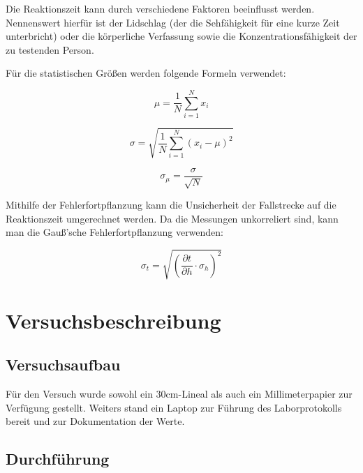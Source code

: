\documentclass[a4paper,12pt]{article}
\begin{document}
Die Reaktionszeit kann durch verschiedene Faktoren beeinflusst werden. Nennenswert hierfür ist der Lidschlag (der die Sehfähigkeit 
für eine kurze Zeit unterbricht) oder die körperliche Verfassung sowie die Konzentrationsfähigkeit der zu testenden Person.

Für die statistischen Größen werden folgende Formeln verwendet:

\begin{equation}
    \label{eq:mittelwert}
    \mu = \frac{1}{N} \sum_{i=1}^{N} x_i
\end{equation}

\begin{equation}
    \label{eq:standardabweichung}
    \sigma = \sqrt{\frac{1}{N} \sum_{i=1}^{N} (x_i - \mu)^2}
\end{equation}

\begin{equation}
    \label{eq:standardabweichungDesMittelwerts}
    \sigma_\mu = \frac{\sigma}{\sqrt{N}}
\end{equation}

\newpage

Mithilfe der Fehlerfortpflanzung kann die Unsicherheit der Fallstrecke auf die Reaktionszeit
umgerechnet werden. Da die Messungen unkorreliert sind, kann man die Gauß'sche Fehlerfortpflanzung
verwenden:

\begin{equation}
    \label{eq:GaußFehlerfortpflanzung}
    \sigma_t = \sqrt{\left(\frac{\partial t}{\partial h} \cdot \sigma_h\right)^2}
\end{equation}


\section{Versuchsbeschreibung}
\subsection{Versuchsaufbau}

Für den Versuch wurde sowohl ein 30cm-Lineal als auch ein Millimeterpapier zur Verfügung gestellt. Weiters stand ein 
Laptop zur Führung des Laborprotokolls bereit und zur Dokumentation der Werte.

\subsection{Durchführung}
\end{document}
